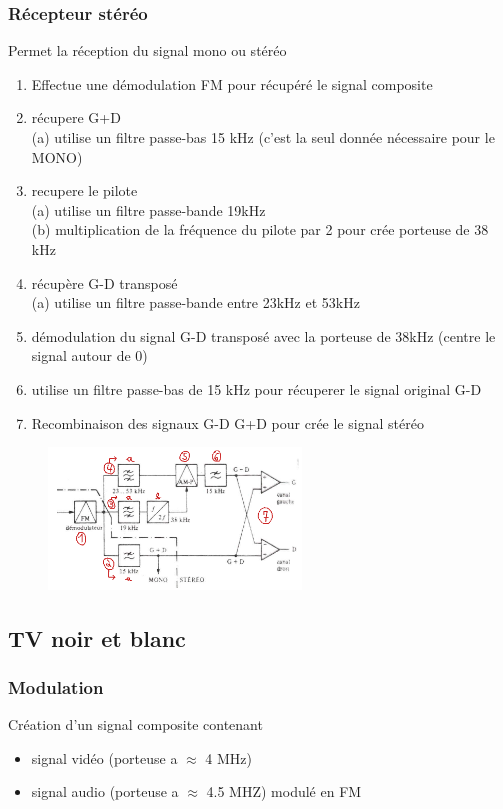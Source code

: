 \documentclass[12pt]{article}
\begin{document}
			\subsubsection{Récepteur stéréo }
				
				Permet la réception du signal mono ou stéréo
				
				\begin{enumerate}
					\item Effectue une démodulation FM pour récupéré le signal composite
					\item récupere G+D\\
						(a) utilise un filtre passe-bas 15 kHz (c'est la seul donnée nécessaire pour le MONO)
						
					\item recupere le pilote\\
						(a) utilise un filtre passe-bande 19kHz\\
						(b) multiplication de la fréquence du pilote par 2  pour crée porteuse de 38 kHz
					\item récupère G-D transposé \\
						(a) utilise un filtre passe-bande entre 23kHz et 53kHz
					\item démodulation du signal G-D transposé avec la porteuse de 38kHz (centre le signal autour de 0)
					\item utilise un filtre passe-bas de 15 kHz pour récuperer le signal original G-D
					\item Recombinaison des signaux G-D G+D pour crée le signal stéréo
				\end{enumerate}
				
				\begin{figure}[htp]
				\centering
				\includegraphics[width=0.6\textwidth]{img/recepteurStereo.png}
				\end{figure}
		\subsection{TV noir et blanc}
			\subsubsection{Modulation}
				 Création d'un signal composite contenant
				 \begin{itemize}
				 	\item signal vidéo (porteuse a $\approx$ 4 MHz)
				 	\item signal audio (porteuse a $\approx$ 4.5 MHZ) modulé en FM
				 	
				 \end{itemize}
				 
\end{document}
